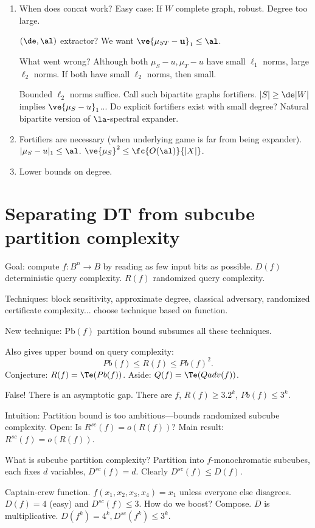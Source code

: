 \begin{enumerate}
\item
When does concat work? 
Easy case: If $W$ complete graph, robust. Degree too large.

$(\de,\al)$ extractor? We want $\ve{\mu_{ST}-\mathbf u}_1\le \al$.

What went wrong? Although both $\mu_S-u,\mu_T-u$ have small $\ell_1$ norms, large $\ell_2$ norms. If both have small $\ell_2$ norms, then small. 

Bounded $\ell_2$ norms suffice. Call such bipartite graphs fortifiers.
$|S|\ge \de|W|$ implies $\ve{\mu_S-u}_1$...
Do explicit fortifiers exist with small degree? Natural bipartite version of $\la$-spectral expander. 
\item
Fortifiers are necessary (when underlying game is far from being expander). 
$|\mu_S-u|_1\le \al$. $\ve{\mu_S}^2\le \fc{O(\al)}{|X|}$.
\item
Lower bounds on degree. 
\end{enumerate}


\section{Separating DT from subcube partition complexity}

Goal: compute $f:B^n\to B$ by reading as few input bits as possible. $D(f)$ deterministic query complexity. $R(f)$ randomized query complexity.

Techniques: block sensitivity, approximate degree, classical adversary, randomized certificate complexity... choose technique based on function.

New technique: Pb$(f)$ partition bound subsumes all these techniques.

Also gives upper bound on query complexity:
\[
Pb(f)\le R(f)\le Pb(f)^2.
\]
Conjecture: $R(f)=\Te(Pb(f))$.
Aside: $Q(f)=\Te(Qadv(f))$.

False! There is an asymptotic gap. There are $f$, $R(f)\ge 3.2^k$, $Pb(f)\le 3^k$.

Intuition: Partition bound is too ambitious---bounds randomized subcube complexity. Open: Is $R^{sc}(f)=o(R(f))$? Main result: $R^{sc}(f)=o(R(f))$.

What is subcube partition complexity? Partition into $f$-monochromatic subcubes, each fixes $d$ variables, $D^{sc}(f)=d$. Clearly $D^{sc}(f)\le D(f)$.

Captain-crew function.  $f(x_1,x_2,x_3,x_4) = x_1$ unless everyone else disagrees. $D(f)=4$ (easy) and $D^{sc}(f)\le 3$.
How do we boost? Compose. $D$ is multiplicative. $D(f^k)=4^k, D^{sc}(f^k)\le 3^k$.

